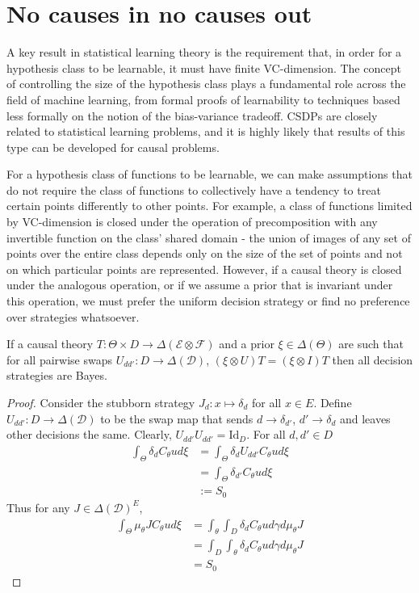\section{No causes in no causes out}

A key result in statistical learning theory is the requirement that, in order for a hypothesis class to be learnable, it must have finite VC-dimension. The concept of controlling the size of the hypothesis class plays a fundamental role across the field of machine learning, from formal proofs of learnability to techniques based less formally on the notion of the bias-variance tradeoff. CSDPs are closely related to statistical learning problems, and it is highly likely that results of this type can be developed for causal problems.

For a hypothesis class of functions to be learnable, we can make assumptions that do not require the class of functions to collectively have a tendency to treat certain points differently to other points. For example, a class of functions limited by VC-dimension is closed under the operation of precomposition with any invertible function on the class' shared domain - the union of images of any set of points over the entire class depends only on the size of the set of points and not on which particular points are represented. However, if a causal theory is closed under the analogous operation, or if we assume a prior that is invariant under this operation, we must prefer the uniform decision strategy or find no preference over strategies whatsoever.

\begin{theorem}\label{th:ncinco}
If a causal theory $T:\Theta\times D\to \Delta(\mathcal{E}\otimes\mathcal{F})$ and a prior $\xi\in \Delta(\Theta)$ are such that for all pairwise swaps $U_{dd'}:D\to \Delta(\mathcal{D})$, $(\xi\otimes U)T = (\xi\otimes I)T$ then all decision strategies are Bayes.
\end{theorem}

\begin{proof}
Consider the stubborn strategy $J_d:x\mapsto \delta_d$ for all $x\in E$. Define $U_{dd'}:D\to \Delta(\mathcal{D})$ to be the swap map that sends $d\to \delta_{d'}$, $d'\to \delta_{d}$ and leaves other decisions the same. Clearly, $U_{dd'} U_{dd'} = \mathrm{Id}_D$. For all $d,d'\in D$
\begin{align}
	\int_\Theta \delta_d C_\theta u d\xi &= \int_\Theta \delta_d U_{dd'} C_\theta u d\xi\\
										&= \int_\Theta \delta_{d'} C_\theta u d\xi\\
										 &:= S_0
\end{align}
Thus for any $J\in \Delta(\mathcal{D})^E$,
\begin{align}
	\int_\Theta \mu_\theta J C_\theta u d\xi &= \int_\theta \int_D \delta_d C_\theta u d\gamma d\mu_\theta J\\
											 &= \int_D \int_\theta \delta_d C_\theta u d\gamma d\mu_\theta J\\
											 &= S_0
\end{align}
\end{proof}

